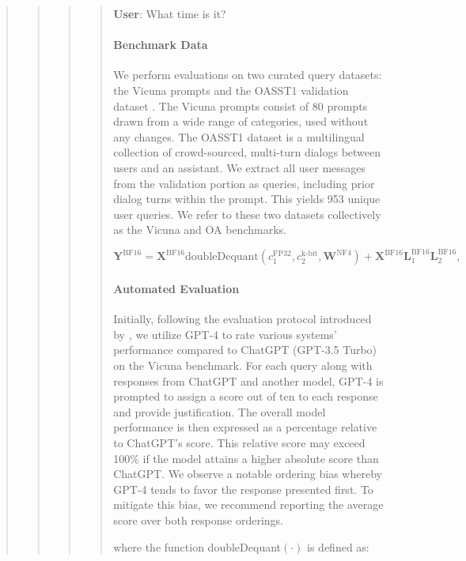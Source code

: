 \begin{quote}
\begin{quote}
\begin{quote}
\begin{quote}
    \textbf{User}: What time is it?

\paragraph{Benchmark Data} We perform evaluations on two curated query datasets: the Vicuna prompts \citep{vicuna2023} and the OASST1 validation dataset \citep{kopf2023openassistant}. The Vicuna prompts consist of 80 prompts drawn from a wide range of categories, used without any changes. The OASST1 dataset is a multilingual collection of crowd-sourced, multi-turn dialogs between users and an assistant. We extract all user messages from the validation portion as queries, including prior dialog turns within the prompt. This yields 953 unique user queries. We refer to these two datasets collectively as the Vicuna and OA benchmarks.

\begin{equation}
    \mathbf{Y}^{\text{BF16}} =  \mathbf{X}^{\text{BF16}} \text{doubleDequant}(c_1^{\text{FP32}}, c_2^{\text{k-bit}}, \mathbf{W}^{\text{NF4}}) + \mathbf{X}^{\text{BF16}}\mathbf{L}^{\text{BF16}}_1\mathbf{L}^{\text{BF16}}_2,
\end{equation}

\paragraph{Automated Evaluation} Initially, following the evaluation protocol introduced by \citet{vicuna2023}, we utilize GPT-4 to rate various systems' performance compared to ChatGPT (GPT-3.5 Turbo) on the Vicuna benchmark. For each query along with responses from ChatGPT and another model, GPT-4 is prompted to assign a score out of ten to each response and provide justification. The overall model performance is then expressed as a percentage relative to ChatGPT’s score. This relative score may exceed 100\% if the model attains a higher absolute score than ChatGPT. We observe a notable ordering bias whereby GPT-4 tends to favor the response presented first. To mitigate this bias, we recommend reporting the average score over both response orderings.



where the function doubleDequant$(\cdot)$ is defined as:


\end{quote}
\end{quote}
\end{quote}
\end{quote}
